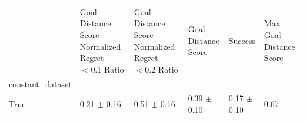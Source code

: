 \begin{tabular}{llllll}
\toprule
 & Goal Distance Score Normalized Regret $< 0.1$ Ratio & Goal Distance Score Normalized Regret $< 0.2$ Ratio & Goal Distance Score & Success & Max Goal Distance Score \\
constant_dataset &  &  &  &  &  \\
\midrule
True & 0.21 $\pm$ 0.16 & 0.51 $\pm$ 0.16 & 0.39 $\pm$ 0.10 & 0.17 $\pm$ 0.10 & 0.67 \\
\bottomrule
\end{tabular}
